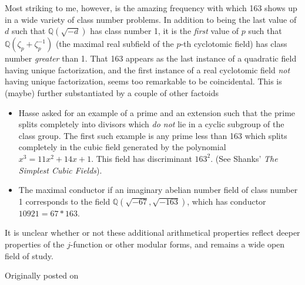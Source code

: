 \documentclass[12pt]{article}
\newcommand{\mb}{\mathbb}
\newcommand{\Q}{\mb{Q}}
\newcommand{\<}{\langle}
\renewcommand{\>}{\rangle}
\begin{document}
Most striking to me, however, is the amazing frequency with which 163
shows up in a wide variety of class number problems.  In addition to
being the last value of $d$ such that $\Q(\sqrt{-d})$ has class number
1, it is the \emph{first} value of $p$ such that
$\Q(\zeta_p+\zeta_p^{-1})$ (the maximal real subfield of the $p$-th
cyclotomic field) has class number \emph{greater} than 1.  That 163
appears as the last instance of a quadratic field having unique
factorization, and the first instance of a real cyclotomic field
\emph{not} having unique factorization, seems too remarkable to be
coincidental.  This is (maybe) further substantiated by a couple of
other factoids
\begin{itemize}
\item Hasse asked for an example of a prime and an extension such that
the prime splits completely into divisors which \emph{do not} lie in a
cyclic subgroup of the class group. The first such example is any prime
less than 163 which splits completely in the cubic field generated by
the polynomial $x^3=11x^2+14x+1$.  This field has discriminant
$163^2$.  (See Shanks' \emph{The Simplest Cubic Fields}).
\item The maximal conductor if an imaginary abelian number field of
class number 1 corresponds to the field $\Q(\sqrt{-67},\sqrt{-163})$,
which has conductor $10921=67*163$.
\end{itemize}
It is unclear whether or not these additional arithmetical properties
reflect deeper properties of the $j$-function or other modular forms,
and remains a wide open field of study.

Originally posted on 
\end{document}
